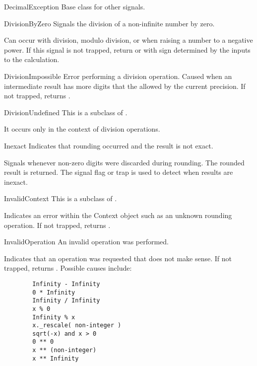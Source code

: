 \begin{classdesc*}{DecimalException}
    Base class for other signals.
\end{classdesc*}

\begin{classdesc*}{DivisionByZero}
    Signals the division of a non-infinite number by zero.

    Can occur with division, modulo division, or when raising a number to
    a negative power.  If this signal is not trapped, return
     or  with sign determined by
    the inputs to the calculation.
\end{classdesc*}

\begin{classdesc*}{DivisionImpossible}
    Error performing a division operation.  Caused when an intermediate result
    has more digits that the allowed by the current precision.  If not trapped,
    returns .
\end{classdesc*}


\begin{classdesc*}{DivisionUndefined}
    This is a subclass of .

    It occurs only in the context of division operations.
\end{classdesc*}

\begin{classdesc*}{Inexact}
    Indicates that rounding occurred and the result is not exact.

    Signals whenever non-zero digits were discarded during rounding.
    The rounded result is returned.  The signal flag or trap is used
    to detect when results are inexact.
\end{classdesc*}


\begin{classdesc*}{InvalidContext}
    This is a subclass of .

    Indicates an error within the Context object such as an unknown
    rounding operation.  If not trapped, returns .
\end{classdesc*}

\begin{classdesc*}{InvalidOperation}
    An invalid operation was performed.

    Indicates that an operation was requested that does not make sense.
    If not trapped, returns .  Possible causes include:

    \begin{verbatim}
        Infinity - Infinity
        0 * Infinity
        Infinity / Infinity
        x % 0
        Infinity % x
        x._rescale( non-integer )
        sqrt(-x) and x > 0
        0 ** 0
        x ** (non-integer)
        x ** Infinity      
    \end{verbatim}    
\end{classdesc*}

